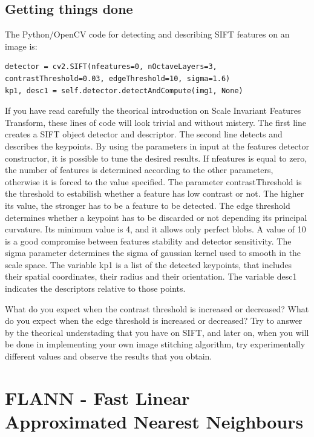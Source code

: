 \documentclass[aps,letterpaper,10pt]{revtex4}
\begin{document}
\subsection{Getting things done}
The Python/OpenCV code for detecting and describing SIFT features on an image is:  
\begin{lstlisting}
detector = cv2.SIFT(nfeatures=0, nOctaveLayers=3, contrastThreshold=0.03, edgeThreshold=10, sigma=1.6)
kp1, desc1 = self.detector.detectAndCompute(img1, None)
\end{lstlisting}
If you have read carefully the theorical introduction on Scale Invariant Features Transform, these lines of code will look trivial and without mistery. The first line creates a SIFT object detector and descriptor. The second line detects and describes the keypoints. By using the parameters in input at the features detector constructor, it is possible to tune the desired results. If nfeatures is equal to zero, the number of features is determined according to the other parameters, otherwise it is forced to the value specified. The parameter contrastThreshold is the threshold to estabilish whether a feature has low contrast or not. The higher its value, the stronger has to be a feature to be detected. The edge threshold determines whether a keypoint has to be discarded or not depending its principal curvature. Its minimum value is 4, and it allows only perfect blobs. A value of 10 is a good compromise between features stability and detector sensitivity. The sigma parameter determines the sigma of gaussian kernel used to smooth in the scale space. The variable kp1 is a list of the detected keypoints, that includes their spatial coordinates, their radius and their orientation. The variable desc1 indicates the descriptors relative to those points.

What do you expect when the contrast threshold is increased or decreased? What do you expect when the edge threshold is increased or decreased? Try to answer by the theorical understading that you have on SIFT, and later on, when you will be done in implementing your own image stitching algorithm, try experimentally different values and observe the results that you obtain. 
\section{FLANN - Fast Linear Approximated Nearest Neighbours}
\end{document}
